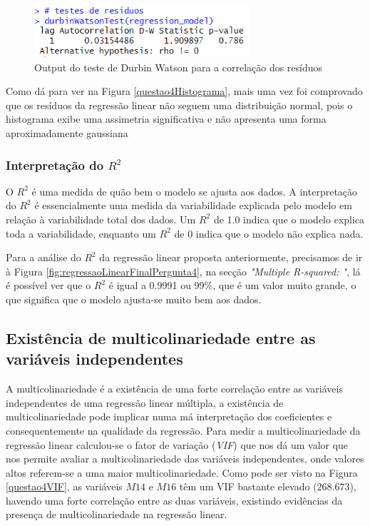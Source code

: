 \documentclass[%
 aip,
cp,  %
 amsmath,amssymb,%
 reprint,%
]{revtex4-2}
\begin{document}
\begin{figure}[!h]
    \centering
    \includegraphics[width=8cm]{imagens/questao4/durbinWatsonTestPergunta4.png}
    \caption{Output do teste de Durbin Watson para a correlação dos resíduos}
    \label{questao4OutputTesteDurbinWatson}
\end{figure}


Como dá para ver na Figura \ref{questao4Histograma}, mais uma vez foi comprovado que os resíduos da regressão linear não seguem uma distribuição normal, pois o histograma exibe uma assimetria significativa e não apresenta uma forma aproximadamente gaussiana




\subsubsection{Interpretação do $R^2$ }
O $R^2$ é uma medida de quão bem o modelo se ajusta aos dados. A interpretação do $R^2$ é essencialmente uma medida da variabilidade explicada pelo modelo em relação à variabilidade total dos dados. Um $R^2$ de 1.0 indica que o modelo explica toda a variabilidade, enquanto um 
$R^2$ de 0 indica que o modelo não explica nada.

Para a análise do $R^2$ da regressão linear proposta anteriormente, precisamos de ir à Figura \ref{fig:regressaoLinearFinalPergunta4}, na secção \textit{"Multiple R-squared: "}, lá é possível ver que o $R^2$ é igual a 0.9991 ou 99\%, que é um valor muito grande, o que significa que o modelo ajusta-se muito bem aos dados.


\subsection{Existência de multicolinariedade entre as variáveis independentes}

A multicolinariedade é a existência de uma forte correlação entre as variáveis independentes de uma regressão linear múltipla, a existência de multicolinariedade pode implicar numa má interpretação dos coeficientes e consequentemente na qualidade da regressão. Para medir a multicolinariedade da regressão linear calculou-se o fator de variação (\textit{VIF}) que nos dá um valor que nos permite avaliar a multicolinariedade das variáveis independentes, onde valores altos referem-se a uma maior multicolinariedade.
Como pode ser visto na Figura \ref{questao4VIF}, as variáveis $M14$ e $M16$ têm um VIF bastante elevado ($268.673$), havendo uma forte correlação entre as duas variáveis, existindo evidências da presença de multicolinariedade na regressão linear.
\end{document}
